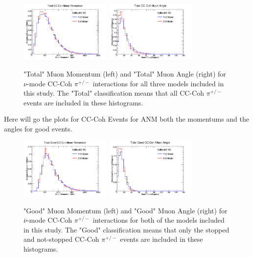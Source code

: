 \documentclass[11pt]{article}
\begin{document}
\begin{figure}[H]
\centering
\includegraphics[width=0.4\textwidth]{CCCohPlots/ANMCCCohTotalMomentum.png}
\includegraphics[width=0.4\textwidth]{CCCohPlots/ANMCCCohTotalAngle.png}
\caption{"Total" Muon Momentum (left) and "Total" Muon Angle (right) for $\nu$-mode CC-Coh $\pi^{+/-}$ interactions for all three models included in this study. The "Total" classification means that all CC-Coh $\pi^{+/-}$ events are included in these histograms.}
\end{figure}\label{fig:AntiNuModeCCCohTotalMomAndAng}

Here will go the plots for CC-Coh Events for ANM both the momentums and the angles for good events.

\begin{figure}[H]
\centering
\includegraphics[width=0.4\textwidth]{CCCohPlots/ANMCCCohGoodMomentum.png}
\includegraphics[width=0.4\textwidth]{CCCohPlots/ANMCCCohGoodAngle.png}
\caption{"Good" Muon Momentum (left) and "Good" Muon Angle (right) for $\bar{\nu}$-mode CC-Coh $\pi^{+/-}$ interactions for both of the models included in this study. The "Good" classification means that only the stopped and not-stopped CC-Coh $\pi^{+/-}$ events are included in these histograms.}
\end{figure}\label{fig:AntiNuModeCCCohGoodMomAndAng}
\end{document}
